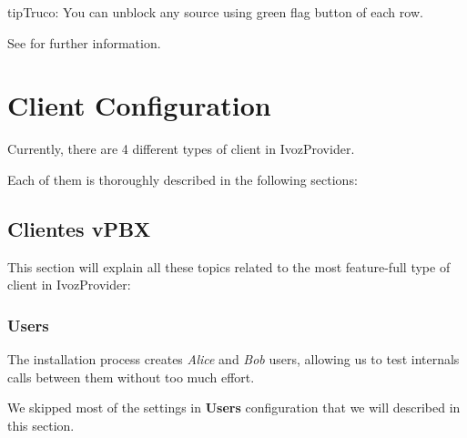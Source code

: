 \documentclass[letterpaper,10pt,spanish]{sphinxmanual}
\begin{document}
\begin{notice}{tip}{Truco:}
You can unblock any source using green flag button of each row.
\end{notice}

See {\hyperref[security_and_maintenance/security/antibruteforce:anti\string-brute\string-force\string-attacks]{}} for further information.


\chapter{Client Configuration}
\label{administration_portal/client/index:client-configuration}\label{administration_portal/client/index::doc}
Currently, there are 4 different types of client in IvozProvider.

Each of them is thoroughly described in the following sections:
\label{administration_portal/client/vpbx/index:vpbx-clients}

\section{Clientes vPBX}
\label{administration_portal/client/vpbx/index:vpbx-clients}\label{administration_portal/client/vpbx/index:clientes-vpbx}\label{administration_portal/client/vpbx/index::doc}\label{administration_portal/client/vpbx/index:id1}
This section will explain all these topics related to the most feature-full type of client in IvozProvider:


\subsection{Users}
\label{administration_portal/client/vpbx/users::doc}\label{administration_portal/client/vpbx/users:users}\label{administration_portal/client/vpbx/users:id1}
The installation process creates \emph{Alice} and \emph{Bob} users, allowing us
to test internals calls between them without too much effort.

We skipped most of the settings in \textbf{Users} configuration that we will described
in this section.
\end{document}
